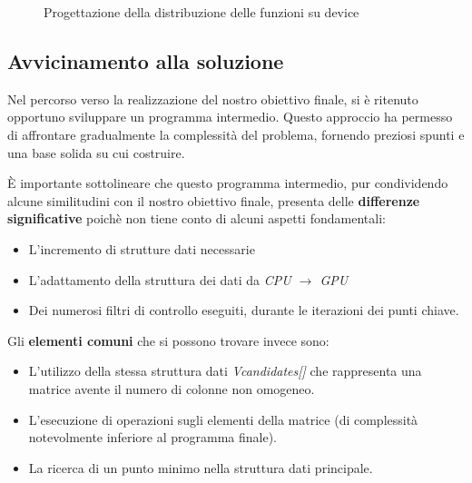\documentclass[12pt,a4paper]{report}
\begin{document}
\begin{figure}[H]
    \centering
    \caption{Progettazione della distribuzione delle funzioni su device}
\end{figure}

\subsection{Avvicinamento alla soluzione}

Nel percorso verso la realizzazione del nostro obiettivo finale, si è ritenuto opportuno sviluppare un programma intermedio. Questo approccio ha permesso di affrontare gradualmente la complessità del problema, fornendo preziosi spunti e una base solida su cui costruire.

È importante sottolineare che questo programma intermedio, pur condividendo alcune similitudini con il nostro obiettivo finale, presenta delle \textbf{differenze significative} poichè non tiene conto di alcuni aspetti fondamentali:
\begin{itemize}
    \item L'incremento di strutture dati necessarie  
    \item L'adattamento della struttura dei dati da \textit{CPU $\rightarrow$ GPU}
    \item Dei numerosi filtri di controllo eseguiti, durante le iterazioni dei punti chiave.
\end{itemize}

Gli \textbf{elementi comuni} che si possono trovare invece sono:

\begin{itemize}
    \item L'utilizzo della stessa struttura dati \textit{Vcandidates[] } che rappresenta una matrice avente il numero di colonne non omogeneo.
    \item L'esecuzione di operazioni sugli elementi della matrice (di complessità notevolmente inferiore al programma finale).
    \item La ricerca di un punto minimo nella struttura dati principale.
\end{itemize}
\end{document}
